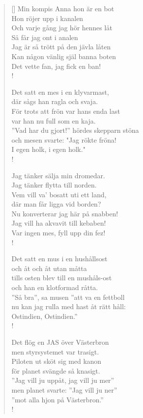 \documentclass[11pt, a4paper]{memoir} %
\begin{document}
\begin{verse}[\versewidth]
Min kompis Anna hon är en bot \\
Hon röjer upp i kanalen \\
Och varje gång jag hör hennes låt \\
Så får jag ont i analen \\
Jag är så trött på den jävla låten \\
Kan någon vänlig själ banna boten \\
Det vette fan, jag fick en ban! \\!

Det satt en mes i en klyvarmast, \\
där sågs han ragla och svaja. \\
För trots att frön var hans enda last \\
var han nu full som en kaja. \\
''Vad har du gjort!'' hördes skepparn stöna \\
och mesen svarte: "Jag rökte fröna! \\
I egen holk, i egen holk." \\!

Jag tänker sälja min dromedar. \\
Jag tänker flytta till norden. \\
Vem vill va’ bosatt uti ett land, \\
där man får ligga vid borden? \\
Nu konverterar jag här på snabben! \\
Jag vill ha akvavit till kebaben! \\
Var ingen mes, fyll upp din fez! \\!

Det satt en mus i en hushållsost \\
och åt och åt utan måtta \\
tills osten blev till en mushåls-ost \\
och han en klotformad råtta. \\
''Så bra'', sa musen ''att va en fettboll \\
nu kan jag rulla med hast åt rätt håll: \\
Ostindien, Ostindien.'' \\!

Det flög en JAS över Västerbron \\
men styrsystemet var trasigt. \\
Piloten ut sköt sig med kanon \\
för planet svängde så knasigt. \\
''Jag vill ju uppåt, jag vill ju mer''\\ 
men planet svarte: ''Jag vill ju ner'' \\
''mot alla hjon på Västerbron.'' \\!


\end{verse}
\end{document}
